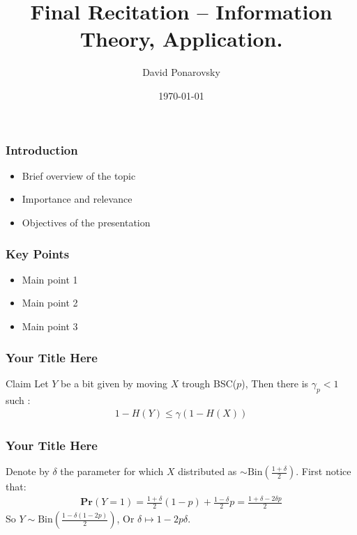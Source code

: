 \documentclass{beamer}
\begin{document}
 

\newcommand*{\Tr}{\textbf{Tr }}


\begin{frame}
    \title{Final Recitation – Information Theory, Application.}
    \author{David Ponarovsky}
    \date{\today}
    \titlepage
\end{frame}


\begin{frame}

\frametitle{Introduction}
\begin{itemize}
    \item Brief overview of the topic
    \item Importance and relevance
    \item Objectives of the presentation
\end{itemize}
\end{frame}

\begin{frame}
\frametitle{Key Points}
\begin{itemize}
    \item Main point 1
    \item Main point 2
    \item Main point 3
\end{itemize}
\end{frame}

\begin{frame}
  \frametitle{Your Title Here}
  
\begin{block}{Claim}
  Let $Y$ be a bit given by moving $X$ trough BSC($p$), Then there is $\gamma_{p} < 1$ such :
  \begin{equation*}
    \begin{split}
      1 - H(Y) \le \gamma \left( 1 - H(X) \right)
    \end{split}
  \end{equation*}
\end{block}

\end{frame}

\begin{frame}
  \frametitle{Your Title Here}
  Denote by $\delta$ the parameter for which $X$ distributed as $\sim \text{Bin}(\frac{1+\delta}{2})$. First notice that:  
  \begin{equation*}
    \begin{split}
      \textbf{Pr}\left( Y = 1 \right) = \frac{1+\delta}{2} (1 -p) + \frac{1-\delta}{2}p = \frac{1 + \delta - 2\delta p}{2}  
    \end{split}
  \end{equation*}
  So $Y \sim \text{Bin}(  \frac{1 -\delta( 1 -  2 p)}{2} )$, Or $\delta \mapsto 1-2p \delta$. 
\end{frame}
\end{document}
